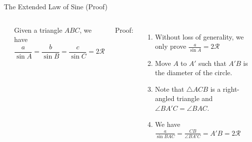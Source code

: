\documentclass{beamer}
\begin{document}
\begin{frame}{The Extended Law of Sine (Proof)}
	\begin{columns}
		\begin{center}
		\end{center}
		\begin{theorem}
			Given a triangle $ABC$, we have 
			\begin{equation*}
				\frac{a}{\sin A} = \frac{b}{\sin B} = \frac{c}{\sin C} = 2\mathcal{R}
			\end{equation*}
		\end{theorem}
		Proof:
		\begin{enumerate}
			\item Without loss of generality, we only prove $\frac{a}{\sin A} = 2\mathcal{R}$
			\item<2-> Move $A$ to $A'$ such that $A'B$ is the diameter of the circle.
			\item<3-> Note that $\triangle ACB$ is a right-angled triangle and $\angle BA'C = \angle BAC$.
			\item<4-> We have $\frac{a}{\sin BAC} = \frac{CB}{\angle BA'C} = A'B = 2\mathcal{R}$
		\end{enumerate}
	\end{columns}	
\end{frame}
\end{document}
